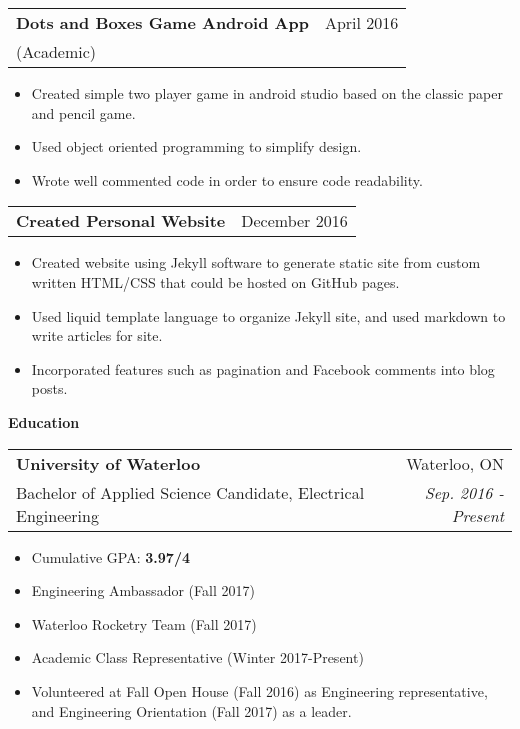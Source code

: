 \documentclass[letterpaper,10pt]{article}
\makeatletter
\newcommand{\resitem}[1]{\item #1 \vspace{-2pt}}
\newcommand{\resheading}[1]{{\large \colorbox{mygrey}{\begin{minipage}{\textwidth}{\textbf{#1 \vphantom{p\^{E}}}}\end{minipage}}}}
\newcommand{\ressubheading}[4]{
    \begin{tabular*}{7in}{l@{\extracolsep{\fill}}r}
    		\textbf{#1} & #2 \\
    		 #3 		& \textit{#4} \\
    \end{tabular*}\vspace{-6pt}}
\newcommand{\resshortsubheading}[2]{
    \begin{tabular*}{7in}{l@{\extracolsep{\fill}}r}
        \textbf{#1} & #2 \\
    \end{tabular*}\vspace{-6pt}}
\makeatother
\begin{document}
\begin{samepage}
    \ressubheading{Dots and Boxes Game Android App}{April 2016}{(Academic)}{}
    \begin{itemize}
        \resitem{Created simple two player game in android studio based on the classic paper and pencil game.}
        \resitem{Used object oriented programming to simplify design.}
        \resitem{Wrote well commented code in order to ensure code readability.}
    \end{itemize}
\end{samepage}
\begin{samepage}
    \resshortsubheading{Created Personal Website}{December 2016}
    \begin{itemize}
        \resitem{Created website using Jekyll software to generate static site from custom written HTML/CSS that could be hosted on GitHub pages.}
        \resitem{Used liquid template language to organize Jekyll site, and used markdown to write articles for site.}
        \resitem{Incorporated features such as pagination and Facebook comments into blog posts.}
    \end{itemize}
\end{samepage}


\resheading{Education}
	\ressubheading{University of Waterloo}{Waterloo, ON}{Bachelor of Applied Science Candidate, Electrical Engineering}{Sep. 2016 - Present}
	\begin{itemize}
        \resitem{Cumulative GPA: \textbf{3.97/4}}
        \resitem{Engineering Ambassador (Fall 2017)} 
        \resitem{Waterloo Rocketry Team (Fall 2017)}
        \resitem{Academic Class Representative (Winter 2017-Present)}
        \resitem{Volunteered at Fall Open House (Fall 2016) as Engineering representative, and Engineering Orientation (Fall 2017) as a leader.}
	\end{itemize}
\end{document}

